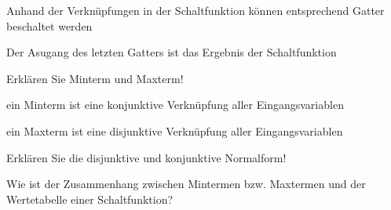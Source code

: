 \documentclass
[
  draft    = true,
  fontsize = 11pt,
  parskip  = half-,
  BCOR     = 0pt,
  DIV      = 11,
  ngerman,
  dvipsnames
]
{scrartcl}
\begin{document}
\begin{mytemize}
\begin{karsten}
\begin{mytemize}
                \begin{mytemize}
                  \item Anhand der Verknüpfungen in der Schaltfunktion können entsprechend Gatter beschaltet werden
                  \item Der Asugang des letzten Gatters ist das Ergebnis der Schaltfunktion
                \end{mytemize}
          \end{mytemize}
        \end{karsten}
  \item Erklären Sie Minterm und Maxterm!
        \begin{achim}
          \begin{mytemize}
            \item ein Minterm ist eine konjunktive Verknüpfung aller Eingangsvariablen
            \item ein Maxterm ist eine disjunktive Verknüpfung aller Eingangsvariablen
          \end{mytemize}
        \end{achim}
  \item Erklären Sie die disjunktive und konjunktive Normalform!
  \item Wie ist der Zusammenhang zwischen Mintermen bzw. Maxtermen und der Wertetabelle einer Schaltfunktion?
\end{mytemize}

\end{document}
